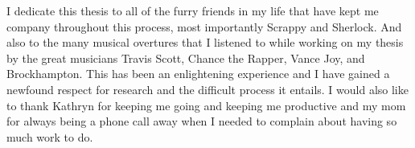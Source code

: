 I dedicate this thesis to all of the furry friends in my life that have kept me company throughout this process, most importantly Scrappy and Sherlock. 
And also to the many musical overtures that I listened to while working on my thesis by the great musicians Travis Scott, Chance the Rapper, Vance Joy, and Brockhampton. 
This has been an enlightening experience and I have gained a newfound respect for research and the difficult process it entails. 
I would also like to thank Kathryn for keeping me going and keeping me productive and my mom for always being a phone call away when I needed to complain about having so much work to do.